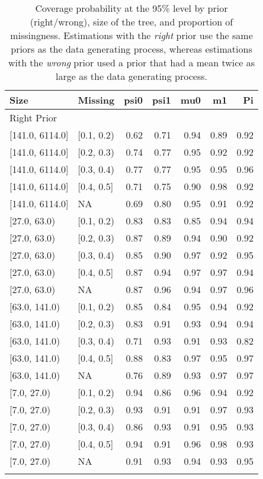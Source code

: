 \begin{table}[ht]
\centering
\begin{tabular}{llrrrrr}
  \toprule
Size & Missing & psi0 & psi1 & mu0 & m1 & Pi \\ 
  \midrule
\multicolumn{7}{l}{Right Prior}\\
{[141.0, 6114.0]} & {[0.1, 0.2)} & 0.62 & 0.71 & 0.94 & 0.89 & 0.92 \\ 
  {[141.0, 6114.0]} & {[0.2, 0.3)} & 0.74 & 0.77 & 0.95 & 0.92 & 0.92 \\ 
  {[141.0, 6114.0]} & {[0.3, 0.4)} & 0.77 & 0.77 & 0.95 & 0.95 & 0.96 \\ 
  {[141.0, 6114.0]} & {[0.4, 0.5]} & 0.71 & 0.75 & 0.90 & 0.98 & 0.92 \\ 
  {[141.0, 6114.0]} & {NA} & 0.69 & 0.80 & 0.95 & 0.91 & 0.92 \\ 
  {[27.0, 63.0)} & {[0.1, 0.2)} & 0.83 & 0.83 & 0.85 & 0.94 & 0.94 \\ 
  {[27.0, 63.0)} & {[0.2, 0.3)} & 0.87 & 0.89 & 0.94 & 0.90 & 0.92 \\ 
  {[27.0, 63.0)} & {[0.3, 0.4)} & 0.85 & 0.90 & 0.97 & 0.92 & 0.95 \\ 
  {[27.0, 63.0)} & {[0.4, 0.5]} & 0.87 & 0.94 & 0.97 & 0.97 & 0.94 \\ 
  {[27.0, 63.0)} & {NA} & 0.87 & 0.96 & 0.94 & 0.97 & 0.96 \\ 
  {[63.0, 141.0)} & {[0.1, 0.2)} & 0.85 & 0.84 & 0.95 & 0.94 & 0.92 \\ 
  {[63.0, 141.0)} & {[0.2, 0.3)} & 0.83 & 0.91 & 0.93 & 0.94 & 0.94 \\ 
  {[63.0, 141.0)} & {[0.3, 0.4)} & 0.71 & 0.93 & 0.91 & 0.93 & 0.82 \\ 
  {[63.0, 141.0)} & {[0.4, 0.5]} & 0.88 & 0.83 & 0.97 & 0.95 & 0.97 \\ 
  {[63.0, 141.0)} & {NA} & 0.76 & 0.89 & 0.93 & 0.97 & 0.97 \\ 
  {[7.0, 27.0)} & {[0.1, 0.2)} & 0.94 & 0.86 & 0.96 & 0.94 & 0.92 \\ 
  {[7.0, 27.0)} & {[0.2, 0.3)} & 0.93 & 0.91 & 0.91 & 0.97 & 0.93 \\ 
  {[7.0, 27.0)} & {[0.3, 0.4)} & 0.86 & 0.93 & 0.91 & 0.95 & 0.93 \\ 
  {[7.0, 27.0)} & {[0.4, 0.5]} & 0.94 & 0.91 & 0.96 & 0.98 & 0.93 \\ 
  {[7.0, 27.0)} & {NA} & 0.91 & 0.93 & 0.94 & 0.93 & 0.95 \\ 
   \bottomrule
\multicolumn{7}{l}{}\\
\end{tabular}
\caption{Coverage probability at the 95\% level by prior (right/wrong), size of the tree, and proportion of missingness.  Estimations with the \emph{right} prior use the same priors as the data generating process, whereas estimations with the \emph{wrong} prior used a prior that had a mean twice as large as the data generating process.} 
\label{tab:coverage95-method-size-missigness}
\end{table}
